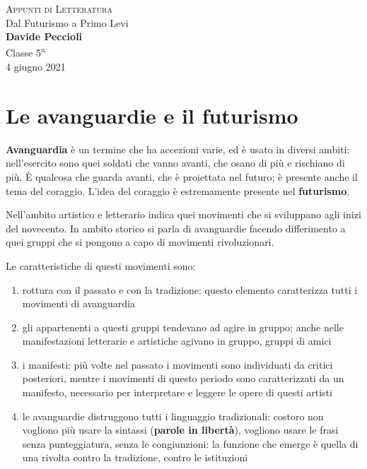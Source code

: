 \documentclass[a4paper, twoside, titlepage]{book}
\newcommand{\elencon}[1]{%
\begin{enumerate}
#1
\end{enumerate}}
\begin{document}
\begin{titlepage} %
\begin{center}
    \null
    \vfill
    {\huge \textsc{Appunti di Letteratura}}\\
    \vspace{2em}
    {\Large Dal Futurismo a Primo Levi}\\
    \vspace{3em}
    {\large \textbf{Davide Peccioli}}\\
    \vspace{1em}
    {\large Classe 5\textsuperscript{a}\\\vspace{0.4em} 4 giugno 2021}
    \fancyfoot[C]{}
    \vfill
\end{center}
\end{titlepage}
\tableofcontents

\chapter{Le avanguardie e il futurismo}

\textbf{Avanguardia} è un termine che ha accezioni varie, ed è usato in diversi ambiti: nell’esercito sono quei soldati che vanno avanti, che osano di più e rischiano di più.
È qualcosa che guarda avanti, che è proiettata nel futuro; è presente anche il tema del coraggio. L’idea del coraggio è estremamente presente nel \textbf{futurismo}.

Nell’ambito artistico e letterario indica quei movimenti che si sviluppano agli inizi del novecento.
In ambito storico si parla di avanguardie facendo differimento a quei gruppi che si pongono a capo di movimenti rivoluzionari.

Le caratteristiche di questi movimenti sono:

\elencon{
	\item rottura con il passato e con la tradizione: questo elemento caratterizza tutti i movimenti di avanguardia 
	\item gli appartenenti a questi gruppi tendevano ad agire in gruppo; anche nelle manifestazioni letterarie e artistiche agivano in gruppo, gruppi di amici 
	\item i manifesti: più volte nel passato i movimenti sono individuati da critici posteriori, mentre i movimenti di questo periodo sono caratterizzati da un manifesto, necessario per interpretare e leggere le opere di questi artisti 
	\item le avanguardie distruggono tutti i linguaggio tradizionali: costoro non vogliono più usare la sintassi (\textbf{parole in libertà}), vogliono usare le frasi senza punteggiatura, senza le congiunzioni: la funzione che emerge è quella di una rivolta contro la tradizione, contro le istituzioni }
\end{document}
